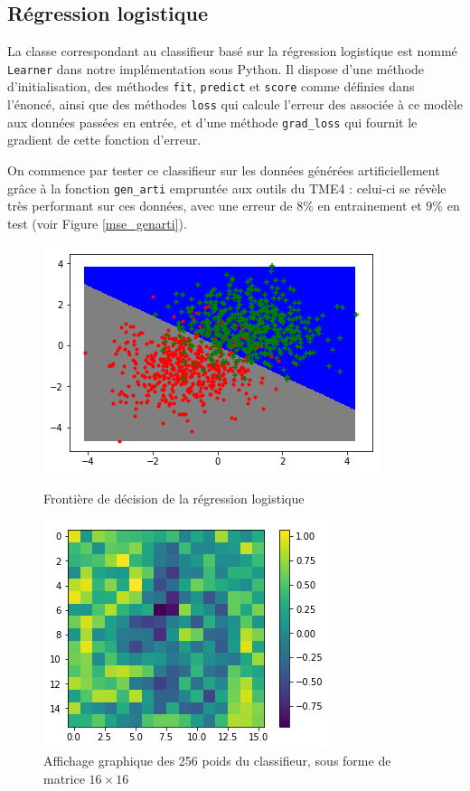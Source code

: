 \documentclass[a4paper]{article}
\begin{document}
\subsection*{Régression logistique}

La classe correspondant au classifieur basé sur la régression logistique est nommé \verb!Learner! dans notre implémentation sous Python. Il dispose d'une méthode d'initialisation, des méthodes \verb!fit!, \verb!predict! et \verb!score! comme définies dans l'énoncé, ainsi que des méthodes \verb!loss! qui calcule l'erreur des associée à ce modèle aux données passées en entrée, et d'une méthode \verb!grad_loss! qui fournit le gradient de cette fonction d'erreur.

On commence par tester ce classifieur sur les données générées artificiellement grâce à la fonction \verb!gen_arti! empruntée aux outils du TME4 : celui-ci se révèle très performant sur ces données, avec une erreur de $8\%$ en entrainement et $9\%$ en test (voir Figure \ref{mse_genarti}).

\begin{figure}[ht!]
\begin{center}
\begin{minipage}{0.45\textwidth}
\includegraphics[scale=0.5]{mse_genarti.png}
\caption{Frontière de décision de la régression logistique}
\label{mse_genarti}
\end{minipage}\hfill
\begin{minipage}{0.45\textwidth}
\includegraphics[scale=0.5]{weights_usps.png}
\caption{Affichage graphique des 256 poids du classifieur, sous forme de matrice $16 \times 16$}
\label{weights_usps}
\end{minipage}
\end{center}
\end{figure}
\end{document}
